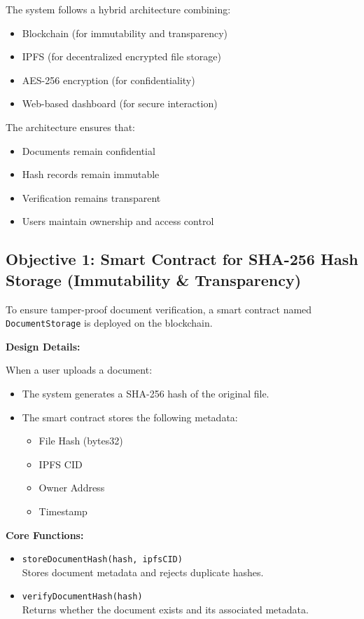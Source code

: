 \documentclass[12pt]{article}
\begin{document}
The system follows a hybrid architecture combining:

\begin{itemize}
\item Blockchain (for immutability and transparency)
\item IPFS (for decentralized encrypted file storage)
\item AES-256 encryption (for confidentiality)
\item Web-based dashboard (for secure interaction)
\end{itemize}

The architecture ensures that:

\begin{itemize}
\item Documents remain confidential
\item Hash records remain immutable
\item Verification remains transparent
\item Users maintain ownership and access control
\end{itemize}

\subsection{Objective 1: Smart Contract for SHA-256 Hash Storage (Immutability \& Transparency)}

To ensure tamper-proof document verification, a smart contract named \texttt{DocumentStorage} is deployed on the blockchain.\cite{ijarsct2022}

\textbf{Design Details:}

When a user uploads a document:

\begin{itemize}
\item The system generates a SHA-256 hash of the original file.
\item The smart contract stores the following metadata:
\begin{itemize}
\item File Hash (bytes32)
\item IPFS CID
\item Owner Address
\item Timestamp
\end{itemize}
\end{itemize}

\textbf{Core Functions:}

\begin{itemize}
\item \texttt{storeDocumentHash(hash, ipfsCID)} \\ 
Stores document metadata and rejects duplicate hashes.

\item \texttt{verifyDocumentHash(hash)} \\ 
Returns whether the document exists and its associated metadata.
\end{itemize}
\end{document}
